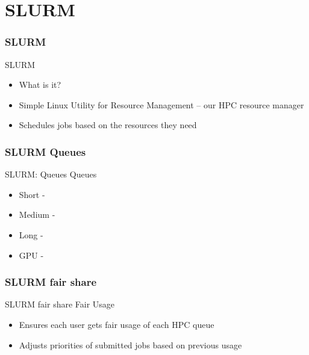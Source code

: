 \part{SLURM}
\frame{\partpage}

{
\section{SLURM}
%
\begin{frame}{SLURM}
\begin{itemize}
\item What is it?
\item Simple Linux Utility for Resource Management – our HPC resource manager
\item Schedules jobs based on the resources they need
\end{itemize}
\end{frame}
}

{
\section{SLURM Queues}
%
\begin{frame}{SLURM: Queues}
\text Queues
\begin{itemize}
\item Short -
\item Medium -
\item Long -
\item GPU -
\end{itemize}
\end{frame}
}

{
\section{SLURM fair share}
%
\begin{frame}{SLURM fair share}
\text Fair Usage
\begin{itemize}
\item Ensures each user gets fair usage of each HPC queue
\item Adjusts priorities of submitted jobs based on previous usage
\end{itemize}
\end{frame}
}

